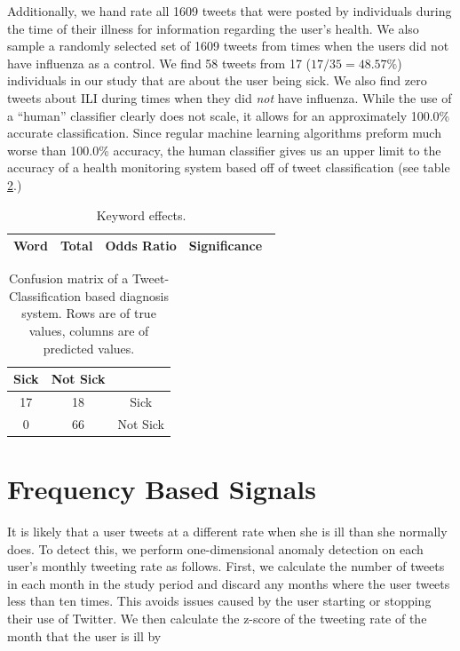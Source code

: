 \documentclass{acm_proc_article-sp}
\begin{document}
Additionally, we hand rate all 1609 tweets that were posted by individuals during the time of their illness for information regarding the user's health.  We also sample a randomly selected set of 1609 tweets from times when the users did not have influenza as a control. We find 58 tweets from 17 (\(17/35 = 48.57\%\))  individuals in our study that are about the user being sick. We also find zero tweets about ILI during times when they did \emph{not} have influenza. While the use of a ``human'' classifier clearly does not scale, it allows for an approximately 100.0\% accurate classification. Since regular machine learning algorithms preform much worse than 100.0\% accuracy, the human classifier gives us an upper limit to the accuracy of  a health monitoring system based off of tweet classification (see table \ref{tab:tweet_classified_confusion}.)


%

\begin{table}
\centering
\begin{tabular}{|c|c|c|c|} \hline
Word& Total &Odds Ratio & Significance\ \\ \hline

\end{tabular}
\caption{Keyword effects.}
\label{tab:tweet_keyword_expert_results}
\end{table}


\begin{table}
\centering
\begin{tabular}{|c|c|c|} \hline
Sick&Not Sick&\ \\ \hline
17 & 18 & Sick\\ \hline
0 & 66  & Not Sick\\
\hline\end{tabular}
\caption{Confusion matrix of a Tweet-Classification based diagnosis system. Rows are of true values, columns are of predicted values.}
\label{tab:tweet_classified_confusion}
\end{table}

\section{Frequency Based Signals}

It is likely that a user tweets at a different rate when she is ill than she normally does. To detect this, we perform one-dimensional anomaly detection on each user's monthly tweeting rate as follows. First, we calculate the number of tweets in each month in the study period and discard any months where the user tweets less than ten times. This avoids issues caused by the user starting or stopping their use of Twitter. We then calculate the z-score of the tweeting rate of the month that the user is ill by
\end{document}
